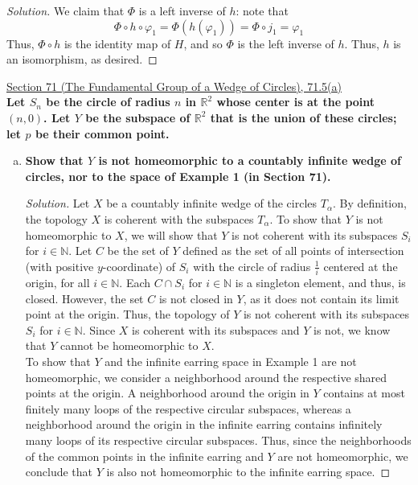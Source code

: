 \documentclass[11pt]{article}
\newcommand{\R}{\mathbb{R}}
\newenvironment{solution}
  {\renewcommand\qedsymbol{$\blacksquare$}\begin{proof}[Solution]}
  {\end{proof}}
\begin{document}
\begin{enumerate}[a)]
\begin{solution}
    We claim that $\Phi$ is a left inverse of $h$: note that
    \[
        \Phi \circ h \circ \varphi_1 = \Phi (h(\varphi_1)) = \Phi \circ j_1 = \varphi_1
    \]
    Thus, $\Phi \circ h$ is the identity map of $H$, and so $\Phi$ is the left inverse of $h$. Thus, $h$ is an isomorphism, as desired.
    \end{solution}
\end{enumerate}

\newpage

\underline{Section 71 (The Fundamental Group of a Wedge of Circles), 71.5(a)} \\

\textbf{Let $S_n$ be the circle of radius $n$ in $\R^2$ whose center is at the point $(n, 0)$. Let $Y$ be the subspace of $\R^2$ that is the union of these circles;
let $p$ be their common point.}
\begin{enumerate}[a)]
    \item \textbf{Show that $Y$ is not homeomorphic to a countably infinite wedge of circles, nor to the space of Example 1 (in Section 71).}
    \begin{solution}
    Let $X$ be a countably infinite wedge of the circles $T_\alpha$. By definition, the topology $X$ is coherent with the subspaces $T_\alpha$. 
    To show that $Y$ is not homeomorphic to $X$, we will show that $Y$ is not coherent with its subspaces $S_i$ for $i \in \mathbb{N}$.
    Let $C$ be the set of $Y$ defined as the set of all points of intersection (with positive $y$-coordinate) of $S_i$ with the circle of radius $\frac{1}{i}$ centered at the origin, for all $i \in \mathbb{N}$.
    Each $C \cap S_i$ for $i \in \mathbb{N}$ is a singleton element, and thus, is closed. However, the set $C$ is not closed in $Y$, as it does not contain its limit point at the origin.
    Thus, the topology of $Y$ is not coherent with its subspaces $S_i$ for $i \in \mathbb{N}$. Since $X$ is coherent with its subspaces and $Y$ is not, we know that $Y$ cannot be homeomorphic to $X$. \\

    To show that $Y$ and the infinite earring space in Example 1 are not homeomorphic, we consider a neighborhood around the respective shared points at the origin. 
    A neighborhood around the origin in $Y$ contains at most finitely many loops of the respective circular subspaces, whereas a neighborhood around the origin in the infinite earring
    contains infinitely many loops of its respective circular subspaces. Thus, since the neighborhoods of the common points in the infinite earring and $Y$ are not homeomorphic, 
    we conclude that $Y$ is also not homeomorphic to the infinite earring space. 
    \end{solution}
\end{enumerate}
\newpage
\end{document}

